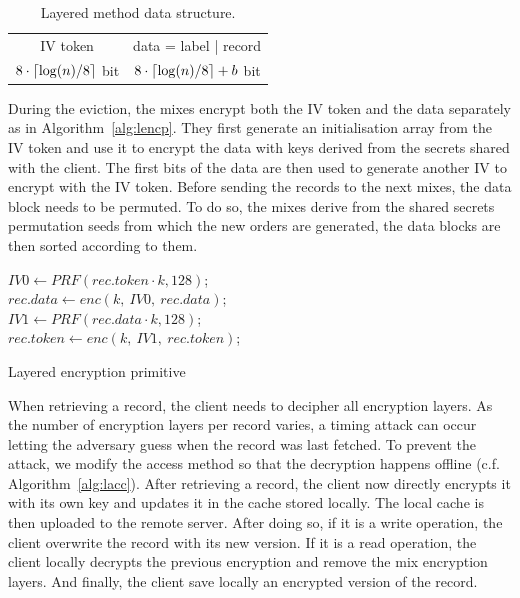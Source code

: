 \documentclass[USenglish,oneside,twocolumn]{article}
\DeclarePairedDelimiter{\ceil}{\lceil}{\rceil}
\begin{document}
\begin{table}[H]
\begin{minipage}[t][][b]{.475\textwidth}
\vspace{0pt}
\centering
\begin{tabular}{|c|c|}
IV token  &  data = label | record  \\
$8\cdot\ceil{\log(n)/8}$ bit  &  $8\cdot\ceil{\log(n)/8}+b$ bit   \\
\end{tabular}
\centering
\caption{Layered method data structure.}
\label{ldata}
\end{minipage}
\end{table}

During the eviction, the mixes encrypt both the IV token and the data separately as in Algorithm~\ref{alg:lencp}. They first generate an initialisation array from the IV token and use it to encrypt the data with keys derived from the secrets shared with the client. The first bits of the data are then used to generate another IV to encrypt with the IV token. Before sending the records to the next mixes, the data block needs to be permuted. To do so, the mixes derive from the shared secrets permutation seeds from which the new orders are generated, the data blocks are then sorted according to them.\\

\begin{algorithm}
\DontPrintSemicolon
{}
$IV0 \gets PRF(rec.token\cdot k, 128)$;\\
$rec.data \gets enc\left(k,\ IV0,\ rec.data \right )$;\\
$IV1 \gets PRF(rec.data \cdot k, 128)$;\\
$rec.token \gets enc\left(k,\ IV1,\ rec.token \right )$;\\
\caption{Layered encryption primitive}
\label{alg:lencp}
\end{algorithm}

When retrieving a record, the client needs to decipher all encryption layers. As the number of encryption layers per record varies, a timing attack can occur letting the adversary guess when the record was last fetched. To prevent the attack, we modify the access method so that the decryption happens offline (c.f. Algorithm~\ref{alg:lacc}). After retrieving a record, the client now directly encrypts it with its own key and updates it in the cache stored locally. The local cache is then uploaded to the remote server.
After doing so, if it is a write operation, the client overwrite the record with its new version. If it is a read operation, the client locally decrypts the previous encryption and remove the mix encryption layers. And finally, the client save locally an encrypted version of the record.\\ 
\end{document}
